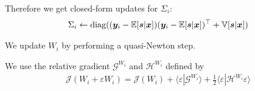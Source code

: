 Therefore we get closed-form updates for $\Sigma_i$: 
\begin{align}
\Sigma_i \leftarrow  \operatorname*{diag}((\boldsymbol{y}_i - \mathbb{E}[\boldsymbol{s} | \boldsymbol{x}]) (\boldsymbol{y}_i - \mathbb{E}[\boldsymbol{s} | \boldsymbol{x}])^{\top}+ \mathbb{V}[\boldsymbol{s} | \boldsymbol{x}])
\end{align}

We update $W_i$ by performing a quasi-Newton step. 

We use the relative gradient $\mathcal{G}^{W_i}$ and $\mathcal{H}^{W_i}$ defined
by
\begin{align}
\mathcal{J}(W_i + \varepsilon W_i) = \mathcal{J}(W_i) + \langle
 \varepsilon|\mathcal{G}^{W_i}\rangle + \frac12 \langle
 \varepsilon|\mathcal{H}^{W_i} \varepsilon \rangle
\end{align}

